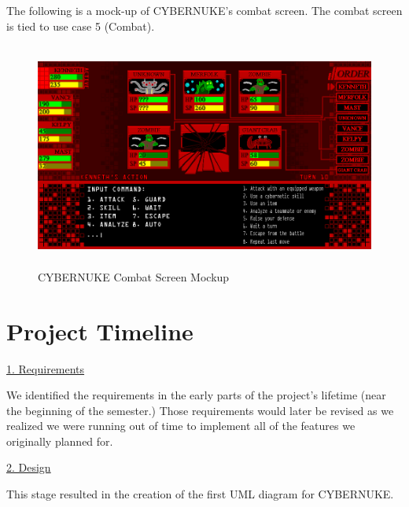 \documentclass[10pt,conference,onecolumn,compsoc]{IEEEtran}
\begin{document}
\pagebreak
The following is a mock-up of CYBERNUKE's combat screen. The combat screen is tied to use case 5 (Combat).
\begin{figure}[ht!]
\centering
\includegraphics[height=281.25px, width=500px]{Mockups/CYBERNUKE_COMBAT_MOCKUP.png}
\caption{CYBERNUKE Combat Screen Mockup}
\label{combat_mockup}
\end{figure}


\pagebreak
\section{Project Timeline}

\underline{1. Requirements}
\vspace{5px}

We identified the requirements in the early parts of the project's lifetime (near the beginning of the semester.) Those requirements would later be revised as we realized we were running out of time to implement all of the features we originally planned for.

\underline{2. Design}
\vspace{5px}

This stage resulted in the creation of the first UML diagram for CYBERNUKE.
\end{document}
